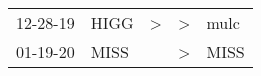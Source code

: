 \begin{supertabular}{p{0.07\textwidth}p{0.06\textwidth}p{0.02\textwidth}p{0.02\textwidth}p{0.06\textwidth}}
 12-28-19\textsuperscript{} &  HIGG\textsuperscript{} &  \textgreater &  \textgreater &  mulc\textsuperscript{} \\
 01-19-20\textsuperscript{} &  MISS\textsuperscript{} &               &  \textgreater &  MISS\textsuperscript{} \\
\end{supertabular}

